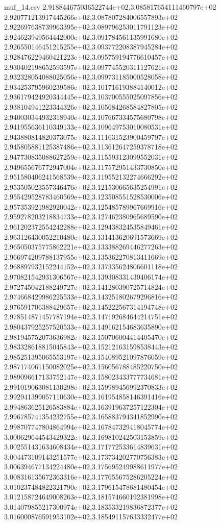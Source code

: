 \begin{filecontents*}{muf_14.csv}
2.918844675036522744e+02,3.085817654111460797e+02
2.920771213917445266e+02,3.087807284006557893e+02
2.922697638739963395e+02,3.089796253011791123e+02
2.924623949564442000e+02,3.091784561135991680e+02
2.926550146451215255e+02,3.093772208387945284e+02
2.928476229460421223e+02,3.095759194776610457e+02
2.930402198652593597e+02,3.097745520311127621e+02
2.932328054088025056e+02,3.099731185000528058e+02
2.934253795960239586e+02,3.101716193884140012e+02
2.936179424920344445e+02,3.103700555025097856e+02
2.938104941223344326e+02,3.105684268584827805e+02
2.940030344932318940e+02,3.107667334575680798e+02
2.941955636110349133e+02,3.109649753010080531e+02
2.943880814820373075e+02,3.111631523900459797e+02
2.945805881125387486e+02,3.113612647259378718e+02
2.947730835088627259e+02,3.115593123099552031e+02
2.949655676772947004e+02,3.117572951433730850e+02
2.951580406241568539e+02,3.119552132274666292e+02
2.953505023557346476e+02,3.121530665635254991e+02
2.955429528783460569e+02,3.123508551528530006e+02
2.957353921982920042e+02,3.125485789967669916e+02
2.959278203218834733e+02,3.127462380965689590e+02
2.961202372554242288e+02,3.129438324535849461e+02
2.963126430052210480e+02,3.131413620691573669e+02
2.965050375775862221e+02,3.133388269446277263e+02
2.966974209788137955e+02,3.135362270813411669e+02
2.968897932152244152e+02,3.137335624806601118e+02
2.970821542931306567e+02,3.139308331439406174e+02
2.972745042188249727e+02,3.141280390725714824e+02
2.974668429986225533e+02,3.143251802679296816e+02
2.976591706388429657e+02,3.145222567314194748e+02
2.978514871457787194e+02,3.147192684644214751e+02
2.980437925257520533e+02,3.149162154683635890e+02
2.981945752073636982e+02,3.150706004414405470e+02
2.983328618815045843e+02,3.152121631598538443e+02
2.985251395065553197e+02,3.154089521097876059e+02
2.987174061150082025e+02,3.156056788485220750e+02
2.989096617133752147e+02,3.158023433777734681e+02
2.991019063081130298e+02,3.159989456992370833e+02
2.992941399057110630e+02,3.161954858146391416e+02
2.994863625126583884e+02,3.163919637257122304e+02
2.996785741354232755e+02,3.165883794341852990e+02
2.998707747804864994e+02,3.167847329418045774e+02
3.000629644543429322e+02,3.169810242503153859e+02
3.002551431634608434e+02,3.171772533614839631e+02
3.004473109143251577e+02,3.173734202770756383e+02
3.006394677134224480e+02,3.175695249988611977e+02
3.008316135672363316e+02,3.177655675286205224e+02
3.010237484822321790e+02,3.179615478681480454e+02
3.012158724649008263e+02,3.181574660192381998e+02
3.014079855217300974e+02,3.183533219836872377e+02
3.016000876591953102e+02,3.185491157633332477e+02

\end{filecontents*}
